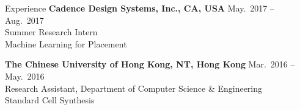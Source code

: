 
\begin{rSection}{Experience}
{\bf Cadence Design Systems, Inc., CA, USA}               \hfill { May.~2017 -- Aug.~2017} \\
Summer Research Intern \\
Machine Learning for Placement

{\bf The Chinese University of Hong Kong, NT, Hong Kong}  \hfill { Mar.~2016 -- May.~2016} \\ 
Research Assistant, Department of Computer Science \& Engineering \\
Standard Cell Synthesis




\end{rSection}


